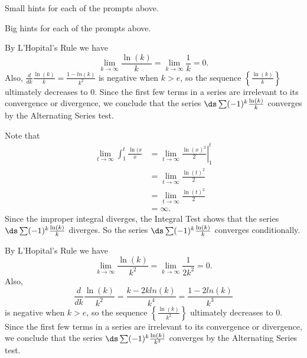 \begin{smallhint}
\ba
	\item Small hints for each of the prompts above.
\ea
\end{smallhint}
\begin{bighint}
\ba
	\item Big hints for each of the prompts above.
\ea
\end{bighint}
\begin{activitySolution}
\ba
	\item 
        \btl
        \item By L'Hopital's Rule we have 
        \[\lim_{k \to \infty} \frac{\ln(k)}{k} = \lim_{k \to \infty} \frac{1}{k} = 0.\]
        Also, $\frac{d}{dk} \frac{\ln(k)}{k} = \frac{1-ln(k)}{k^2}$ is negative when $k > e$, so the sequence $\left\{ \frac{\ln(k)}{k} \right\}$ ultimately decreases to 0. Since the first few terms in a series are irrelevant to its convergence or divergence, we conclude that the series $\ds \sum (-1)^k \frac{\ln(k)}{k}$ converges by the Alternating Series test.

        \item Note that
        \begin{align*}
        \lim_{t \to \infty} \int_{1}^{t} \frac{\ln(x}{x} &= \lim_{t \to \infty} \left. \frac{\ln(x)^2}{2} \right|_1^t \\
            &= \lim_{t \to \infty} \frac{\ln(t)^2}{2}  \\
            &= \lim_{t \to \infty} \frac{\ln(t)^2}{2}  \\
            &= \infty.
        \end{align*}
        Since the improper integral diverges, the Integral Test shows that the series $\ds \sum (-1)^k \frac{\ln(k)}{k}$ diverges. So the series $\ds \sum (-1)^k \frac{\ln(k)}{k}$ converges conditionally.

        \etl

    \item
        \btl
        \item By L'Hopital's Rule we have
        \[\lim_{k \to \infty} \frac{\ln(k)}{k^2} = \lim_{k \to \infty} \frac{1}{2k^2} = 0.\]
        Also,
        \[\frac{d}{dk} \frac{\ln(k)}{k^2} = \frac{k-2kln(k)}{k^4} = \frac{1-2ln(k)}{k^3}\]
         is negative when $k > e$, so the sequence $\left\{ \frac{\ln(k)}{k^2} \right\}$ ultimately decreases to 0. Since the first few terms in a series are irrelevant to its convergence or divergence, we conclude that the series $\ds \sum (-1)^k \frac{\ln(k)}{k^2}$ converges by the Alternating Series test.


\end{activitySolution}

